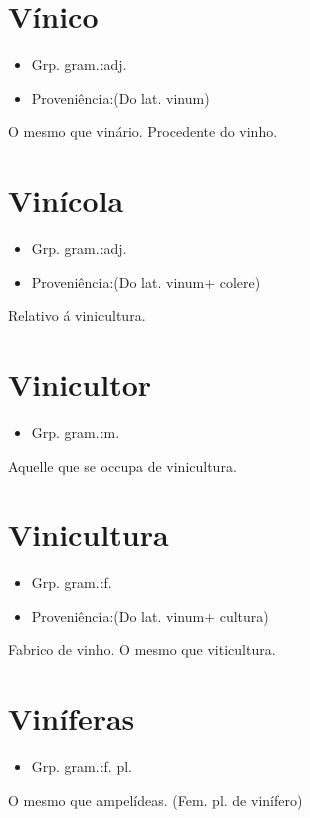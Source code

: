 \documentclass{article}
\begin{document}
\section{Vínico}
\begin{itemize}
\item {Grp. gram.:adj.}
\end{itemize}
\begin{itemize}
\item {Proveniência:(Do lat. \textunderscore vinum\textunderscore )}
\end{itemize}
O mesmo que \textunderscore vinário\textunderscore .
Procedente do vinho.
\section{Vinícola}
\begin{itemize}
\item {Grp. gram.:adj.}
\end{itemize}
\begin{itemize}
\item {Proveniência:(Do lat. \textunderscore vinum\textunderscore  + \textunderscore colere\textunderscore )}
\end{itemize}
Relativo á vinicultura.
\section{Vinicultor}
\begin{itemize}
\item {Grp. gram.:m.}
\end{itemize}
Aquelle que se occupa de vinicultura.
\section{Vinicultura}
\begin{itemize}
\item {Grp. gram.:f.}
\end{itemize}
\begin{itemize}
\item {Proveniência:(Do lat. \textunderscore vinum\textunderscore  + \textunderscore cultura\textunderscore )}
\end{itemize}
Fabrico de vinho.
O mesmo que \textunderscore viticultura\textunderscore .
\section{Viníferas}
\begin{itemize}
\item {Grp. gram.:f. pl.}
\end{itemize}
O mesmo que \textunderscore ampelídeas\textunderscore .
(Fem. pl. de \textunderscore vinífero\textunderscore )
\end{document}
